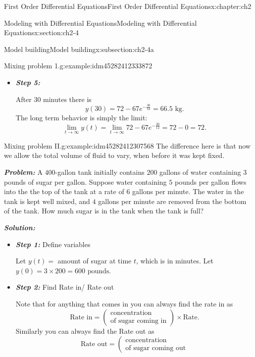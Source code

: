 \documentclass[oneside,10pt,]{book}
\newcommand{\alert}[1]{\textbf{\textit{#1}}}
\numberwithin{equation}{section}
\numberwithin{equation}{section}
\begin{document}
\begin{chapterptx}{First Order Differential Equations}{}{First Order Differential Equations}{}{}{x:chapter:ch2}
\begin{sectionptx}{Modeling with Differential Equations}{}{Modeling with Differential Equations}{}{}{x:section:ch2-4}
\begin{subsectionptx}{Model building}{}{Model building}{}{}{x:subsection:ch2-4a}
\begin{example}{Mixing problem 1.}{g:example:idm45282412333872}
\begin{itemize}[label=\textbullet]
\begin{equation*}
y(t)=72-67e^{-\frac{t}{12}}.
\end{equation*}
%
\item{}\alert{Step 5:}%
\par
After 30 minutes there is%
\begin{equation*}
y(30)=72-67e^{-\frac{30}{12}}=66.5\mbox{ kg}.
\end{equation*}
The long term behavior is simply the limit:%
\begin{equation*}
\lim_{t\to\infty}y(t)=\lim_{t\to\infty}72-67e^{-\frac{30}{12}}=72-0=72.
\end{equation*}
%
\end{itemize}
\end{example}
\begin{example}{Mixing problem II.}{g:example:idm45282412307568}%
The difference here is that now we allow the total volume of fluid to vary, when before it was kept fixed.%
\par
\alert{Problem:} A \(400\)-gallon tank initially contains \(200\) gallons of water containing \(3\) pounds of sugar per gallon. Suppose water containing \(5\) pounds per gallon flows into the the top of the tank at a rate of \(6\) gallons per minute. The water in the tank is kept well mixed, and \(4\) gallons per minute are removed from the bottom of the tank. How much sugar is in the tank when the tank is full?%
\par
\alert{Solution:}%
%
\begin{itemize}[label=\textbullet]
\item{}\alert{Step 1:} Define variables%
\par
Let \(y(t)=\) amount of sugar at time \(t\), which is in minutes. Let \(y(0)=3\times200=600\mbox{ pounds}\).%
\item{}\alert{Step 2:} Find Rate in\slash{} Rate out%
\par
Note that for anything that comes in you can always find the rate in as%
\begin{equation*}
\mbox{Rate in}=\left(\begin{array}{c}
\mbox{concentration}\\
\mbox{of sugar coming in}
\end{array}\right)\times\mbox{Rate}.
\end{equation*}
Similarly you can always find the Rate out as%
\begin{equation*}
\mbox{Rate out}=\left(\begin{array}{c}
\mbox{concentration}\\
\mbox{of sugar coming out}

\end{array}
\end{equation*}
\end{itemize}
\end{example}
\end{subsectionptx}
\end{sectionptx}
\end{chapterptx}
\end{document}
